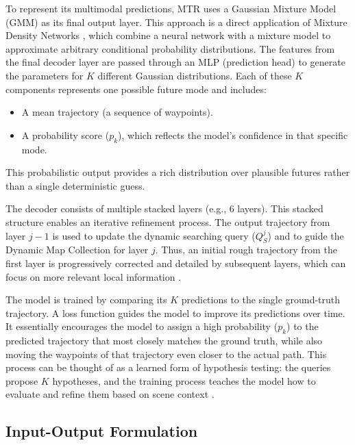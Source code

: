 To represent its multimodal predictions, MTR uses a Gaussian Mixture Model (GMM) as its final output layer. This approach is a direct application of Mixture Density Networks \cite{Bishop1994MDN}, which combine a neural network with a mixture model to approximate arbitrary conditional probability distributions. The features from the final decoder layer are passed through an MLP (prediction head) to generate the parameters for $K$ different Gaussian distributions. Each of these $K$ components represents one possible future mode and includes:
\begin{itemize}
    \item A mean trajectory (a sequence of waypoints).
    \item A probability score ($p_k$), which reflects the model's confidence in that specific mode.
\end{itemize}
This probabilistic output provides a rich distribution over plausible futures rather than a single deterministic guess.

The decoder consists of multiple stacked layers (e.g., 6 layers). This stacked structure enables an iterative refinement process. The output trajectory from layer $j-1$ is used to update the dynamic searching query ($Q_S^j$) and to guide the Dynamic Map Collection for layer $j$. Thus, an initial rough trajectory from the first layer is progressively corrected and detailed by subsequent layers, which can focus on more relevant local information \cite{Shi2022MTR}.

The model is trained by comparing its $K$ predictions to the single ground-truth trajectory. A loss function guides the model to improve its predictions over time. It essentially encourages the model to assign a high probability ($p_k$) to the predicted trajectory that most closely matches the ground truth, while also moving the waypoints of that trajectory even closer to the actual path. This process can be thought of as a learned form of hypothesis testing: the queries propose $K$ hypotheses, and the training process teaches the model how to evaluate and refine them based on scene context \cite{Shi2022MTR}.

\subsection{Input-Output Formulation}
\label{sec:model_mtr_io}

